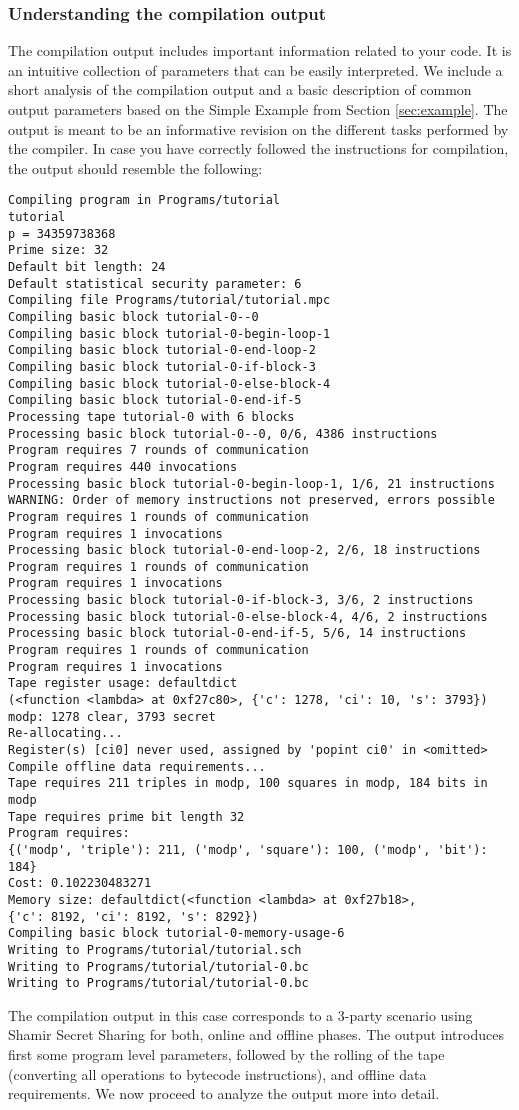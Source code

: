 \subsubsection{Understanding the compilation output}

The compilation output includes important information related to your code. 
It is an intuitive collection of parameters that can be easily interpreted. 
We include a short analysis of the compilation output and a basic description of common output parameters based on the Simple Example from  Section \ref{sec:example}.
 The output is meant to be an informative revision on the different tasks performed by the compiler. In case you have correctly followed the instructions for compilation, the output should resemble the following: 

\begin{verbatim}
Compiling program in Programs/tutorial
tutorial
p = 34359738368
Prime size: 32
Default bit length: 24
Default statistical security parameter: 6
Compiling file Programs/tutorial/tutorial.mpc
Compiling basic block tutorial-0--0
Compiling basic block tutorial-0-begin-loop-1
Compiling basic block tutorial-0-end-loop-2
Compiling basic block tutorial-0-if-block-3
Compiling basic block tutorial-0-else-block-4
Compiling basic block tutorial-0-end-if-5
Processing tape tutorial-0 with 6 blocks
Processing basic block tutorial-0--0, 0/6, 4386 instructions
Program requires 7 rounds of communication
Program requires 440 invocations
Processing basic block tutorial-0-begin-loop-1, 1/6, 21 instructions
WARNING: Order of memory instructions not preserved, errors possible
Program requires 1 rounds of communication
Program requires 1 invocations
Processing basic block tutorial-0-end-loop-2, 2/6, 18 instructions
Program requires 1 rounds of communication
Program requires 1 invocations
Processing basic block tutorial-0-if-block-3, 3/6, 2 instructions
Processing basic block tutorial-0-else-block-4, 4/6, 2 instructions
Processing basic block tutorial-0-end-if-5, 5/6, 14 instructions
Program requires 1 rounds of communication
Program requires 1 invocations
Tape register usage: defaultdict
(<function <lambda> at 0xf27c80>, {'c': 1278, 'ci': 10, 's': 3793})
modp: 1278 clear, 3793 secret
Re-allocating...
Register(s) [ci0] never used, assigned by 'popint ci0' in <omitted>
Compile offline data requirements...
Tape requires 211 triples in modp, 100 squares in modp, 184 bits in modp
Tape requires prime bit length 32
Program requires: 
{('modp', 'triple'): 211, ('modp', 'square'): 100, ('modp', 'bit'): 184}
Cost: 0.102230483271
Memory size: defaultdict(<function <lambda> at 0xf27b18>, 
{'c': 8192, 'ci': 8192, 's': 8292})
Compiling basic block tutorial-0-memory-usage-6
Writing to Programs/tutorial/tutorial.sch
Writing to Programs/tutorial/tutorial-0.bc
Writing to Programs/tutorial/tutorial-0.bc
\end{verbatim}
The compilation output in this case corresponds  to a 3-party scenario using Shamir Secret Sharing for both, online and offline phases. 
The output introduces first some program level parameters, followed by the rolling of the tape (converting all operations to bytecode instructions), and offline data requirements. We now proceed to analyze the output more into detail.

